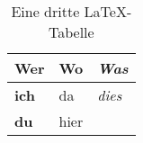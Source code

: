 
\begin{table}[h!]
\begin{center}
\begin{tabular}{p{2cm} C{2cm} R{2cm}}
\toprule
\textbf{Wer}    &    Wo     &    \textit{Was}     \\ 
\midrule
\textbf{ich}    &    da     &    \textit{dies}    \\  
\textbf{du}     &    hier   &           \\ 
\bottomrule
\end{tabular}
\caption{Eine dritte LaTeX-Tabelle}
\end{center}
\end{table}


